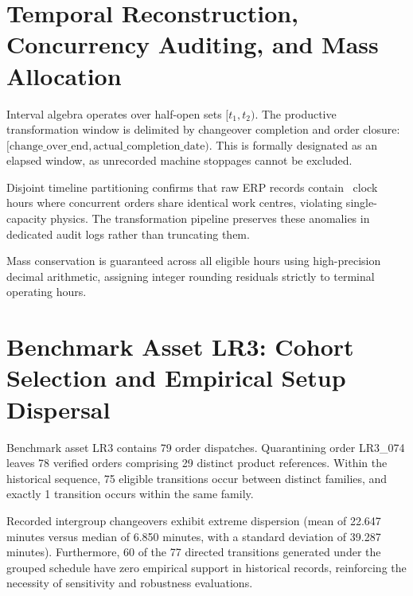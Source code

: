 \section{Temporal Reconstruction, Concurrency Auditing, and Mass Allocation}
\label{sec:reconstruction_audit}

Interval algebra operates over half-open sets $[t_1, t_2)$. The productive transformation window is delimited by changeover completion and order closure: $[\text{change\_over\_end}, \text{actual\_completion\_date})$. This is formally designated as an elapsed window, as unrecorded machine stoppages cannot be excluded.



Disjoint timeline partitioning confirms that raw ERP records contain \ResourceHoursWithConflict\ clock hours where concurrent orders share identical work centres, violating single-capacity physics. The transformation pipeline preserves these anomalies in dedicated audit logs rather than truncating them.



Mass conservation is guaranteed across all eligible hours using high-precision decimal arithmetic, assigning integer rounding residuals strictly to terminal operating hours.

\section{Benchmark Asset LR3: Cohort Selection and Empirical Setup Dispersal}
\label{sec:lr3_selection}




Benchmark asset LR3 contains 79 order dispatches. Quarantining order LR3\_074 leaves 78 verified orders comprising 29 distinct product references. Within the historical sequence, 75 eligible transitions occur between distinct families, and exactly 1 transition occurs within the same family.



Recorded intergroup changeovers exhibit extreme dispersion (mean of 22.647 minutes versus median of 6.850 minutes, with a standard deviation of 39.287 minutes). Furthermore, 60 of the 77 directed transitions generated under the grouped schedule have zero empirical support in historical records, reinforcing the necessity of sensitivity and robustness evaluations.

